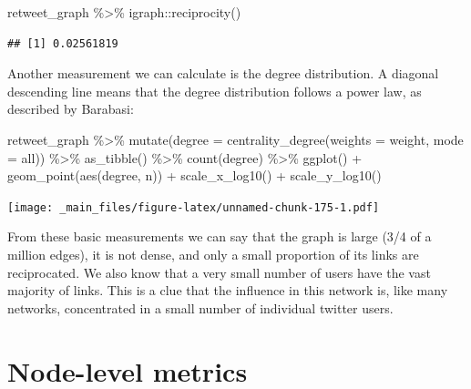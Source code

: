 \documentclass[
]{book}
\newenvironment{Shaded}{\begin{snugshade}}{\end{snugshade}}
\newcommand{\AttributeTok}[1]{\textcolor[rgb]{0.77,0.63,0.00}{#1}}
\newcommand{\FunctionTok}[1]{\textcolor[rgb]{0.00,0.00,0.00}{#1}}
\newcommand{\NormalTok}[1]{#1}
\newcommand{\SpecialCharTok}[1]{\textcolor[rgb]{0.00,0.00,0.00}{#1}}
\newcommand{\StringTok}[1]{\textcolor[rgb]{0.31,0.60,0.02}{#1}}
\begin{document}
\begin{Shaded}
\begin{Highlighting}[]
\NormalTok{retweet\_graph }\SpecialCharTok{\%\textgreater{}\%}\NormalTok{ igraph}\SpecialCharTok{::}\FunctionTok{reciprocity}\NormalTok{()}
\end{Highlighting}
\end{Shaded}

\begin{verbatim}
## [1] 0.02561819
\end{verbatim}

Another measurement we can calculate is the degree distribution. A diagonal descending line means that the degree distribution follows a power law, as described by Barabasi:

\begin{Shaded}
\begin{Highlighting}[]
\NormalTok{retweet\_graph }\SpecialCharTok{\%\textgreater{}\%} \FunctionTok{mutate}\NormalTok{(}\AttributeTok{degree =} \FunctionTok{centrality\_degree}\NormalTok{(}\AttributeTok{weights  =}\NormalTok{ weight, }\AttributeTok{mode =} \StringTok{\textquotesingle{}all\textquotesingle{}}\NormalTok{)) }\SpecialCharTok{\%\textgreater{}\%} 
  \FunctionTok{as\_tibble}\NormalTok{() }\SpecialCharTok{\%\textgreater{}\%} \FunctionTok{count}\NormalTok{(degree) }\SpecialCharTok{\%\textgreater{}\%} \FunctionTok{ggplot}\NormalTok{() }\SpecialCharTok{+} \FunctionTok{geom\_point}\NormalTok{(}\FunctionTok{aes}\NormalTok{(degree, n)) }\SpecialCharTok{+} \FunctionTok{scale\_x\_log10}\NormalTok{() }\SpecialCharTok{+} \FunctionTok{scale\_y\_log10}\NormalTok{()}
\end{Highlighting}
\end{Shaded}

\texttt{[image: \_main\_files/figure-latex/unnamed-chunk-175-1.pdf]}

From these basic measurements we can say that the graph is large (3/4 of a million edges), it is not dense, and only a small proportion of its links are reciprocated. We also know that a very small number of users have the vast majority of links. This is a clue that the influence in this network is, like many networks, concentrated in a small number of individual twitter users.

\hypertarget{node-level-metrics-1}{%
\section{Node-level metrics}\label{node-level-metrics-1}}
\end{document}
